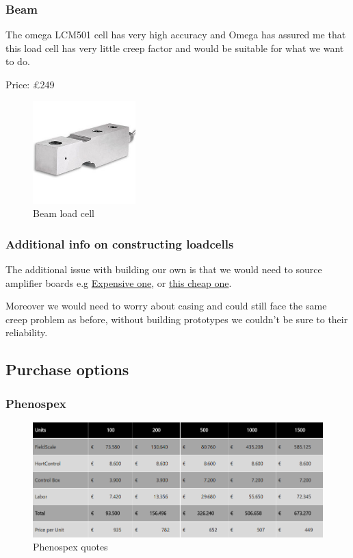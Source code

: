 \documentclass[11pt]{article}
\begin{document}
\begin{enumerate}
\subsubsection{Beam}
\label{sec-2-1-2}
The omega LCM501 cell has very high accuracy and Omega has assured me that this load cell has very little
creep factor and would be suitable for what we want to do. 

Price: £249
\begin{figure}[htb]
\centering
\includegraphics[width=150px]{./images/beam.jpg}
\caption{\label{fig:Beam}Beam load cell}
\end{figure}

\subsubsection{Additional info on constructing loadcells}
\label{sec-2-1-3}

The additional issue with building our own is that we would need to source amplifier boards 
e.g \href{http://www.omega.co.uk/pptst/TXDIN1600S.html}{Expensive one}, or \href{https://www.proto-pic.co.uk/sparkfun-load-cell-amplifier-hx711.html?gclid\%3DCjwKEAjw5vu8BRC8rIGNrqbPuSESJADG8RV0786RXJOCIUPOVZj8QwYWbhOZYXY1rYzwlpp2wl3cfRoCgTTw_wcB}{this cheap one}. 

Moreover we would need to worry about casing and could still face the same creep problem as before, 
without building prototypes we couldn't be sure to their reliability. 

\subsection{Purchase options}
\label{sec-2-2}

\subsubsection{Phenospex}
\label{sec-2-2-1}

\begin{figure}[htb]
\centering
\includegraphics[width=.9\linewidth]{./images/price.png}
\caption{\label{fig:Phenospex-prices}Phenospex quotes}
\end{figure}



\end{enumerate}
\end{document}
